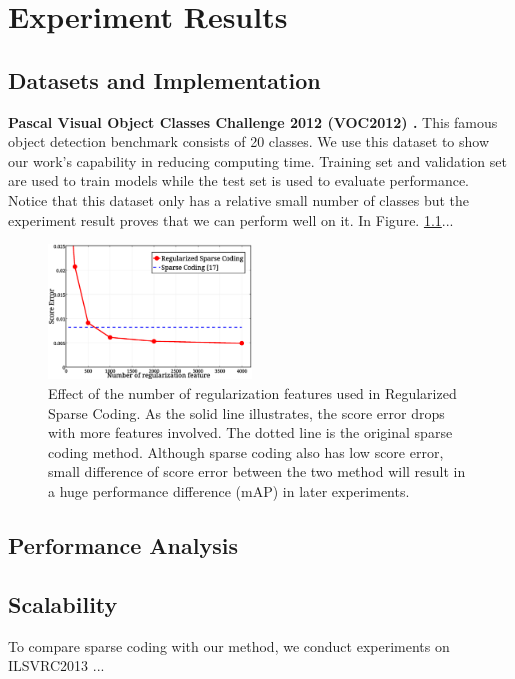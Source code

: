 \chapter{Experiment Results} \label{secEXP}
\section{Datasets and Implementation}

\textbf{Pascal Visual Object Classes Challenge 2012 (VOC2012) \cite{pascal-voc-2012}.} This famous object detection benchmark consists of 20 classes. We use this dataset to show our work's capability in reducing computing time. Training set and validation set are used to train models while the test set is used to evaluate performance. Notice that this dataset only has a relative small number of classes but the experiment result proves that we can perform well on it. In Figure. \ref{figFeatureUsage}...

\begin{figure}
\centering
\includegraphics[width=0.48\textwidth]{featureUsage}
\caption{Effect of the number of regularization features used in Regularized Sparse Coding\protect\footnotemark[3]. As the solid line illustrates, the score error drops with more features involved. The dotted line is the original sparse coding method. Although sparse coding also has low score error, small difference of score error between the two method will result in a huge performance difference (mAP) in later experiments.}
\label{figFeatureUsage}
\end{figure}

\section{Performance Analysis}

\section{Scalability}

To compare sparse coding with our method, we conduct experiments on ILSVRC2013 ...

